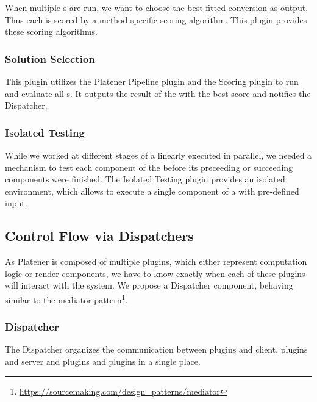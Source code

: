 \documentclass[../ClassicThesis.tex]{subfiles}
\begin{document}
When multiple {\fabmethod}s are run, we want to choose the best fitted conversion as output. Thus each {\fabmethod} is scored by a method-specific scoring algorithm. This plugin provides these scoring algorithms.

\subsubsection{Solution Selection}

This plugin utilizes the Platener Pipeline plugin and the Scoring plugin to run and evaluate all {\fabmethod}s. It outputs the result of the {\fabmethod} with the best score and notifies the Dispatcher.

\subsubsection{Isolated Testing}

While we worked at different stages of a linearly executed {\fabmethod} in parallel, we needed a mechanism to test each component of the {\fabmethod} before its preceeding or succeeding components were finished. The Isolated Testing plugin provides an isolated environment, which allows to execute a single component of a {\fabmethod} with pre-defined input.


\subsection{Control Flow via Dispatchers}

As Platener is composed of multiple plugins, which either represent computation logic or render components, we have to know exactly when each of these plugins will interact with the system. We propose a Dispatcher component, behaving similar to the mediator pattern\footnote{\url{https://sourcemaking.com/design_patterns/mediator}}.

\subsubsection{Dispatcher}

The Dispatcher organizes the communication between plugins and client, plugins and server and plugins and plugins in a single place. 
\end{document}
